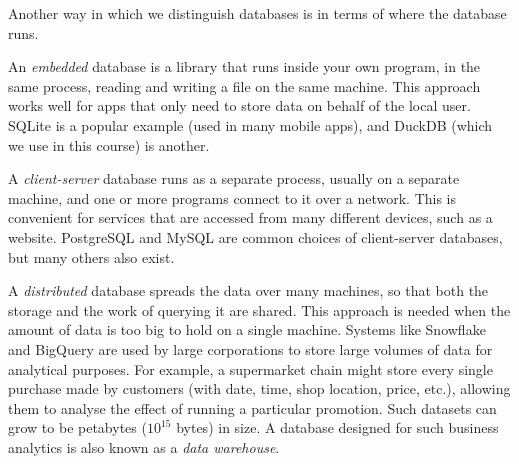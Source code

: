\begin{frame}
\begin{center}
    \end{center}
\end{frame}
\label{l:data-models}

Another way in which we distinguish databases is in terms of where the database runs.

An \emph{embedded} database is a library that runs inside your own program, in the same process, reading and writing a file on the same machine.
This approach works well for apps that only need to store data on behalf of the local user.
SQLite is a popular example (used in many mobile apps), and DuckDB (which we use in this course) is another.

A \emph{client-server} database runs as a separate process, usually on a separate machine, and one or more programs connect to it over a network.
This is convenient for services that are accessed from many different devices, such as a website.
PostgreSQL and MySQL are common choices of client-server databases, but many others also exist.

A \emph{distributed} database spreads the data over many machines, so that both the storage and the work of querying it are shared.
This approach is needed when the amount of data is too big to hold on a single machine.
Systems like Snowflake and BigQuery are used by large corporations to store large volumes of data for analytical purposes.
For example, a supermarket chain might store every single purchase made by customers (with date, time, shop location, price, etc.), allowing them to analyse the effect of running a particular promotion.
Such datasets can grow to be petabytes ($10^{15}$ bytes) in size.
A database designed for such business analytics is also known as a \emph{data warehouse}.

